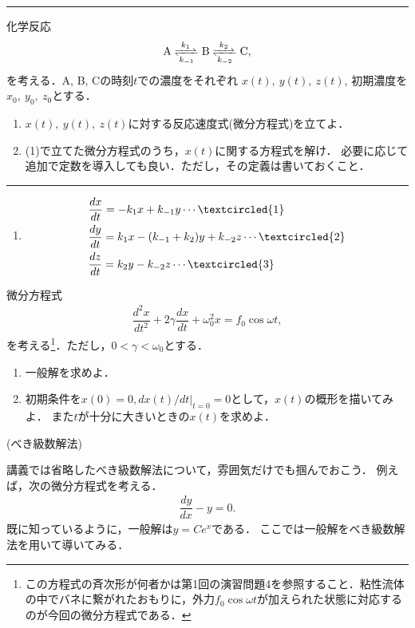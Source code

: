 \documentclass[11pt,a4]{jsarticle}
\numberwithin{equation}{section}
\begin{document}
%
\newpage
\hrule
\enshu
化学反応
\begin{align*}
 \ce{A  <=>[k_1][k_{-1}] B <=>[k_2][k_{-2}] C}, 
\end{align*}
を考える．A, B, Cの時刻$t$での濃度をそれぞれ
$x\left(t\right),~y\left(t\right),~z\left(t\right)$,
初期濃度を$x_0,~y_0,~z_0$とする．
\begin{enumerate}[(1)]
  \item $x(t),~y(t),~z(t)$に対する反応速度式(微分方程式)を立てよ．
  \item (1)で立てた微分方程式のうち，$x(t)$に関する方程式を解け．
	必要に応じて追加で定数を導入しても良い．ただし，その定義は書いておくこと．
\end{enumerate}
%
\hrule
%
\begin{enumerate}[(1)]
  \item 
\begin{align*}
  & \dfrac{dx}{dt} = -k_1 x + k_{-1} y \cdots \textcircled{1}\\
  & \dfrac{dy}{dt} = k_1 x -(k_{-1}+k_2)y + k_{-2}z \cdots \textcircled{2}\\
  & \dfrac{dz}{dt} = k_2 y - k_{-2}z \cdots \textcircled{3}
\end{align*} 
\end{enumerate}
%
\newpage
%
\enshu
微分方程式
\begin{align*}
 \dfrac{d^2x}{dt^2} + 2\gamma \dfrac{dx}{dt} + \omega_{0}^{2}x = f_0 \cos \omega t, 
\end{align*}
を考える\footnote{この方程式の斉次形が何者かは第1回の演習問題4を参照すること．粘性流体の中でバネに繋がれたおもりに，外力$f_0 \cos \omega t$が加えられた状態に対応するのが今回の微分方程式である．}．ただし，$0< \gamma < \omega_{0}$とする．
\begin{enumerate}[(1)]
  \item 一般解を求めよ．
  \item 初期条件を$x(0)=0, d x(t)/dt|_{t=0}=0$として，$x(t)$の概形を描いてみよ．
	また$t$が十分に大きいときの$x(t)$を求めよ．
\end{enumerate}
%
\enshu (べき級数解法)
%

講義では省略したべき級数解法について，雰囲気だけでも掴んでおこう．
例えば，次の微分方程式を考える．
\begin{align*}
  \dfrac{dy}{dx} - y = 0. 
\end{align*}
既に知っているように，一般解は$y=Ce^{x}$である．
ここでは一般解をべき級数解法を用いて導いてみる．
\end{document}

